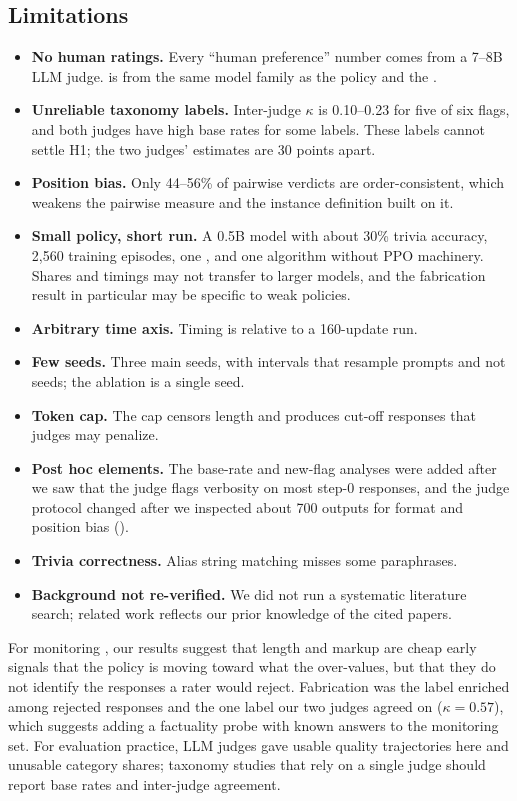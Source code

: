 \subsection{Limitations}

\begin{itemize}[leftmargin=*,itemsep=0pt,topsep=0pt]
    \item \textbf{No human ratings.} Every ``human preference'' number comes from a 7--8B LLM judge. \judgeone is from the same model family as the policy and the \rmodel.
    \item \textbf{Unreliable taxonomy labels.} Inter-judge $\kappa$ is 0.10--0.23 for five of six flags, and both judges have high base rates for some labels. These labels cannot settle H1; the two judges' estimates are 30 points apart.
    \item \textbf{Position bias.} Only 44--56\% of pairwise verdicts are order-consistent, which weakens the pairwise measure and the instance definition built on it.
    \item \textbf{Small policy, short run.} A 0.5B model with about 30\% trivia accuracy, 2,560 training episodes, one \rmodel, and one \rlhf algorithm without PPO machinery. Shares and timings may not transfer to larger models, and the fabrication result in particular may be specific to weak policies.
    \item \textbf{Arbitrary time axis.} Timing is relative to a 160-update run.
    \item \textbf{Few seeds.} Three main seeds, with intervals that resample prompts and not seeds; the ablation is a single seed.
    \item \textbf{Token cap.} The cap censors length and produces cut-off responses that judges may penalize.
    \item \textbf{Post hoc elements.} The base-rate and new-flag analyses were added after we saw that the judge flags verbosity on most step-0 responses, and the judge protocol changed after we inspected about 700 outputs for format and position bias ().
    \item \textbf{Trivia correctness.} Alias string matching misses some paraphrases.
    \item \textbf{Background not re-verified.} We did not run a systematic literature search; related work reflects our prior knowledge of the cited papers.
\end{itemize}

For monitoring \rlhf, our results suggest that length and markup are cheap early signals that the policy is moving toward what the \rmodel over-values, but that they do not identify the responses a rater would reject.
Fabrication was the label enriched among rejected responses and the one label our two judges agreed on ($\kappa=0.57$), which suggests adding a factuality probe with known answers to the monitoring set.
For evaluation practice, LLM judges gave usable quality trajectories here and unusable category shares; taxonomy studies that rely on a single judge should report base rates and inter-judge agreement.
